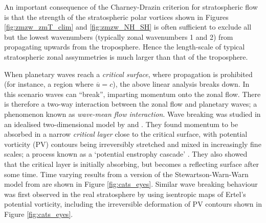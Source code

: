 An important consequence of the Charney-Drazin criterion for stratospheric flow
is that the strength of the stratospheric polar vortices shown in Figures
\ref{fig:zmzw_zmT_clim} and \ref{fig:zmzw_NH_SH} is often sufficient to exclude
all but the lowest wavenumbers (typically zonal wavenumbers 1 and 2) from
propagating upwards from the troposphere. Hence the length-scale of typical
stratospheric zonal assymmetries is much larger than that of the troposphere. 

\bigskip When planetary waves reach a \emph{critical surface}, where propagation
is prohibited (for instance, a region where $\overline{u} = c$), the above
linear analysis breaks down. In this scenario waves can ``break'', imparting
momentum onto the zonal flow. There is therefore a two-way interaction between
the zonal flow and planetary waves; a phenomenon known as \emph{wave-mean flow
  interaction}. Wave breaking was studied in an idealised two-dimensional model
by \citet{Stewartson1978} and \citet{Warn1978}. They found momentum to be
absorbed in a narrow \emph{critical layer} close to the critical surface, with
potential vorticity (PV) contours being irreversibly stretched and mixed in
increasingly fine scales; a process known as a `potential enstrophy cascade'
\citep[e.g.,][]{Rhines1979}. They also showed that the critical layer is
initially absorbing, but becomes a reflecting surface after some time. Time
varying results from a version of the Stewartson-Warn-Warn model from
\citet{Andrews1987} are shown in Figure \ref{fig:cats_eyes}. Similar wave
breaking behaviour was first observed in the real stratosphere by
\citet{McIntyre1983} using isentropic maps of Ertel's potential vorticity,
including the irreversible deformation of PV contours shown in Figure
\ref{fig:cats_eyes}.

